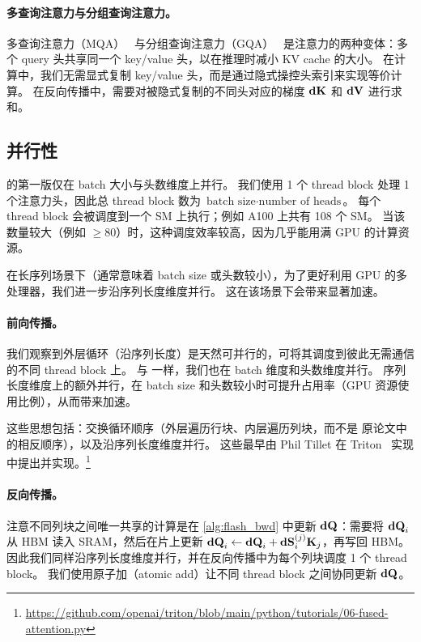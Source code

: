\paragraph{多查询注意力与分组查询注意力。}
多查询注意力（MQA）~\citep{shazeer2019fast} 与分组查询注意力（GQA）~\citep{ainslie2023gqa} 是注意力的两种变体：多个 query 头共享同一个 key/value 头，以在推理时减小 KV cache 的大小。
在计算中，我们无需显式复制 key/value 头，而是通过隐式操控头索引来实现等价计算。
在反向传播中，需要对被隐式复制的不同头对应的梯度 $\mathbf{dK}$ 和 $\mathbf{dV}$ 进行求和。

\subsection{并行性}
\label{subsec:parallelism}

\sysnameone 的第一版仅在 batch 大小与头数维度上并行。
我们使用 1 个 thread block 处理 1 个注意力头，因此总 thread block 数为
$\text{batch size} \cdot \text{number of heads}$。
每个 thread block 会被调度到一个 SM 上执行；例如 A100 上共有 108 个 SM。
当该数量较大（例如 $\geq 80$）时，这种调度效率较高，因为几乎能用满 GPU 的计算资源。

在长序列场景下（通常意味着 batch size 或头数较小），为了更好利用 GPU 的多处理器，我们进一步沿序列长度维度并行。
这在该场景下会带来显著加速。


\paragraph{前向传播。}
我们观察到外层循环（沿序列长度）是天然可并行的，可将其调度到彼此无需通信的不同 thread block 上。
与 \sysnameone 一样，我们也在 batch 维度和头数维度并行。
序列长度维度上的额外并行，在 batch size 和头数较小时可提升占用率（GPU 资源使用比例），从而带来加速。

这些思想包括：交换循环顺序（外层遍历行块、内层遍历列块，而不是 \sysnameone 原论文中的相反顺序），以及沿序列长度维度并行。
这些最早由 Phil Tillet 在 Triton~\citep{tillet2019triton}
实现中提出并实现。\footnote{\url{https://github.com/openai/triton/blob/main/python/tutorials/06-fused-attention.py}}

\paragraph{反向传播。}
注意不同列块之间唯一共享的计算是在 \cref{alg:flash_bwd} 中更新 $\mathbf{dQ}$：需要将 $\mathbf{dQ}_i$ 从 HBM 读入 SRAM，然后在片上更新
$\mathbf{dQ}_{i} \leftarrow \mathbf{dQ}_i + \mathbf{dS}_{i}^{(j)} \mathbf{K}_j$，再写回 HBM。
因此我们同样沿序列长度维度并行，并在反向传播中为每个列块调度 1 个 thread block。
我们使用原子加（atomic add）让不同 thread block 之间协同更新 $\mathbf{dQ}$。

